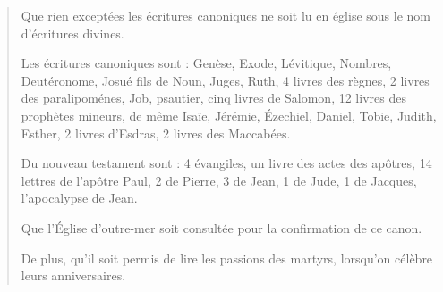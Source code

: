 \begin{quotation}
Que rien exceptées les écritures canoniques ne soit lu en église
sous le nom d’écritures divines.

Les écritures canoniques sont : Genèse, Exode, Lévitique,
Nombres, Deutéronome,
Josué fils de Noun, Juges, Ruth, 4 livres des règnes,
2 livres des paralipoménes,
Job, psautier, cinq livres de Salomon,
12 livres des prophètes mineurs,
de même Isaïe, Jérémie, Ézechiel, Daniel,
Tobie, Judith, Esther,
2 livres d’Esdras, 2 livres des Maccabées.

Du nouveau testament sont :
4 évangiles, un livre des actes des apôtres,
14 lettres de l’apôtre Paul, 2 de Pierre,
3 de Jean, 1 de Jude, 1 de Jacques,
l’apocalypse de Jean.

Que l’Église d'outre-mer soit consultée
pour la confirmation de ce canon.

De plus, qu'il soit permis de lire les passions des martyrs,
lorsqu'on célèbre leurs anniversaires.
\end{quotation}

